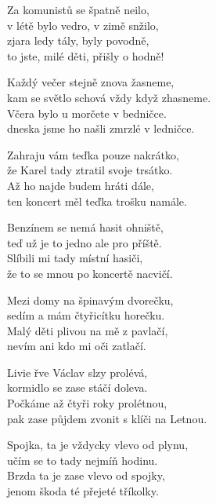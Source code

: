 
\re{}
Za komunistů se špatně neilo,\\
v létě bylo vedro, v zimě snžilo,\\
zjara ledy tály, byly povodně,\\
to jste, milé děti, přišly o hodně!

\re{}
Každý večer stejně znova žasneme,\\
kam se světlo schová vždy když zhasneme.\\
Včera bylo u morčete v bedničce.\\
dneska jsme ho našli zmrzlé v ledničce.

\re{}
Zahraju vám teďka pouze nakrátko,\\
že Karel tady ztratil svoje trsátko.\\
Až ho najde budem hráti dále,\\
ten koncert měl teďka trošku namále.

\re{}
Benzínem se nemá hasit ohniště,\\
teď už je to jedno ale pro příště.\\
Slíbili mi tady místní hasiči,\\
že to se mnou po koncertě nacvičí.

\re{}
Mezi domy na špinavým dvorečku,\\
sedím a mám čtyřicítku horečku.\\
Malý děti plivou na mě z pavlačí,\\
nevím ani kdo mi oči zatlačí.

\re{}
Livie řve Václav slzy prolévá,\\
kormidlo se zase stáčí doleva.\\
Počkáme až čtyři roky prolétnou,\\
pak zase půjdem zvonit s klíči na Letnou.

\re{}
Spojka, ta je vždycky vlevo od plynu,\\
učím se to tady nejmíň hodinu.\\
Brzda ta je zase vlevo od spojky,\\
jenom škoda té přejeté tříkolky.

\esong